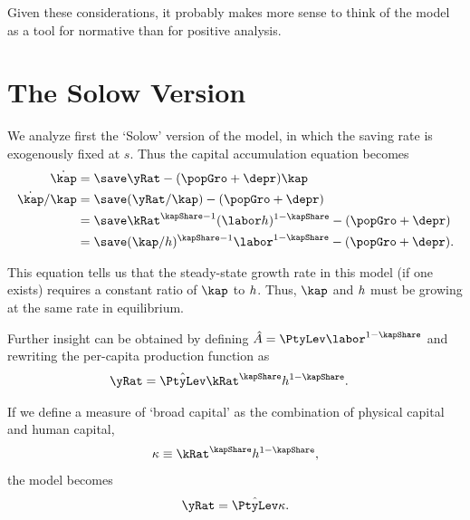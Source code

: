 \documentclass{handout}
\begin{document}
Given these considerations, it probably makes more sense to think of the
model as a tool for normative than for positive analysis.

\section{The Solow Version}

We analyze first the `Solow' version of the model, in which
the saving rate is exogenously fixed at $s$.  Thus the 
capital accumulation equation becomes
\begin{equation}\begin{gathered}\begin{aligned}
  \label{eq:kdots}
  \dot{\kap} & =  \save \yRat - (\popGro+\depr) \kap
\\ \dot{\kap}/\kap & =  \save (\yRat/\kap) - (\popGro+\depr)
\\ & =  \save \kRat^{\kapShare - 1} (\labor \hLucas)^{1-\kapShare}-(\popGro+\depr)
\\ & =  \save (\kap/\hLucas)^{\kapShare-1} \labor^{1-\kapShare} -(\popGro+\depr).
\end{aligned}\end{gathered}\end{equation}

This equation tells us that the steady-state growth 
rate in this model (if one exists) requires a constant
ratio of $\kap$ to $h$.  Thus, $\kap$ and $h$ must be growing
at the same rate in equilibrium.

Further insight can be obtained by defining $\hat{A} = \PtyLev \labor^{1-\kapShare}$
and rewriting the per-capita production function as 
\begin{equation}\begin{gathered}\begin{aligned}
  \label{eq:CRSprodfunc}
  \yRat & =  \hat{\PtyLev} \kRat^{\kapShare} \hLucas^{1-\kapShare}.
\end{aligned}\end{gathered}\end{equation}

If we define a measure of `broad capital' as the combination
of physical capital and human capital,
\begin{equation}
  \label{eq:kappa}
  \kappa \equiv \kRat^\kapShare \hLucas^{1-\kapShare},
\end{equation}
the model becomes
\begin{equation}
  \label{eq:ak}
  \yRat = \hat{\PtyLev} \kappa.
\end{equation}
\end{document}
